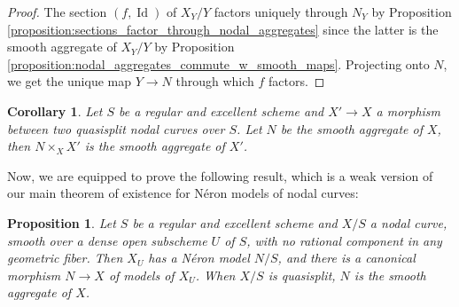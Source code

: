 \documentclass[a4paper,12pt]{amsart} %
\numberwithin{equation}{subsection}
\DeclareMathOperator{\Id}{Id}
\newcommand{\Hom}{\operatorname{Hom}}
\theoremstyle{definition}
\theoremstyle{plain}%
\newtheorem{proposition}[definition]{Proposition}
\newtheorem{corollary}[definition]{Corollary}
\theoremstyle{remark}
\begin{document}
\begin{proof}
The section $(f,\Id)$ of $X_Y/Y$ factors uniquely through $N_Y$ by Proposition \ref{proposition:sections_factor_through_nodal_aggregates} since the latter is the smooth aggregate of $X_Y/Y$ by Proposition \ref{proposition:nodal_aggregates_commute_w_smooth_maps}. Projecting onto $N$, we get the unique map $Y\to N$ through which $f$ factors.
\end{proof}

\begin{corollary}\label{corollary:nodal_aggregates_commute_w_refinements}
Let $S$ be a regular and excellent scheme and $X'\to X$ a morphism between two quasisplit nodal curves over $S$. Let $N$ be the smooth aggregate of $X$, then $N\times_X X'$ is the smooth aggregate of $X'$.
\end{corollary}

Now, we are equipped to prove the following result, which is a weak version of our main theorem of existence for N\'eron models of nodal curves:

\begin{proposition}\label{proposition:ns-neron_models_of_nodal_curves_1}
Let $S$ be a regular and excellent scheme and $X/S$ a nodal curve, smooth over a dense open subscheme $U$ of $S$, with no rational component in any geometric fiber. Then $X_U$ has a N\'eron model $N/S$, and there is a canonical morphism $N\to X$ of models of $X_U$. When $X/S$ is quasisplit, $N$ is the smooth aggregate of $X$.
\end{proposition}


\end{document}
